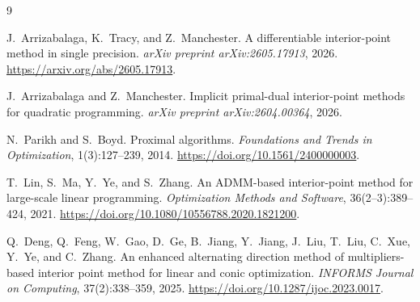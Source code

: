 \documentclass[9pt]{extarticle}
\begin{document}
\begin{thebibliography}{9}


J.~Arrizabalaga, K.~Tracy, and Z.~Manchester.
\newblock A differentiable interior-point method in single precision.
\newblock \emph{arXiv preprint arXiv:2605.17913}, 2026.
\newblock \url{https://arxiv.org/abs/2605.17913}.

J.~Arrizabalaga and Z.~Manchester.
\newblock Implicit primal-dual interior-point methods for quadratic programming.
\newblock \emph{arXiv preprint arXiv:2604.00364}, 2026.

N.~Parikh and S.~Boyd.
\newblock Proximal algorithms.
\newblock \emph{Foundations and Trends in Optimization}, 1(3):127--239, 2014.
\newblock \url{https://doi.org/10.1561/2400000003}.

T.~Lin, S.~Ma, Y.~Ye, and S.~Zhang.
\newblock An ADMM-based interior-point method for large-scale linear programming.
\newblock \emph{Optimization Methods and Software}, 36(2--3):389--424, 2021.
\newblock \url{https://doi.org/10.1080/10556788.2020.1821200}.

Q.~Deng, Q.~Feng, W.~Gao, D.~Ge, B.~Jiang, Y.~Jiang, J.~Liu, T.~Liu, C.~Xue,
Y.~Ye, and C.~Zhang.
\newblock An enhanced alternating direction method of multipliers-based interior
point method for linear and conic optimization.
\newblock \emph{INFORMS Journal on Computing}, 37(2):338--359, 2025.
\newblock \url{https://doi.org/10.1287/ijoc.2023.0017}.

\end{thebibliography}
\end{document}
